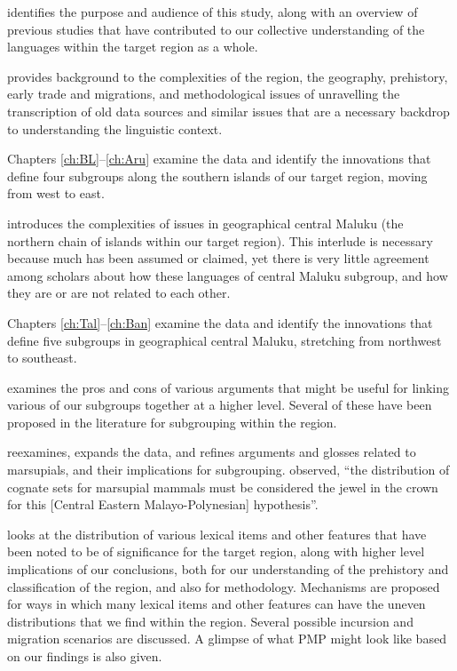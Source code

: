  identifies the purpose
and audience of this study,
along with an overview of previous studies that have contributed to our collective understanding of the languages within the target region as a whole.

 provides background to the complexities of the region,
the geography, prehistory, early trade
and migrations, and methodological issues of unravelling the transcription of old data sources
and similar issues that are a necessary backdrop to understanding the linguistic context.

Chapters \ref{ch:BL}--\ref{ch:Aru} examine the data
and identify the innovations that define four subgroups along the southern islands of our target region,
moving from west to east.

 introduces the complexities of issues in geographical central Maluku (the northern chain of islands within our target region).
This interlude is necessary because much has been assumed or claimed,
yet there is very little agreement among scholars about how these languages of central Maluku subgroup,
and how they are or are not related to each other.

Chapters \ref{ch:Tal}--\ref{ch:Ban} examine the data
and identify the innovations that define five subgroups in geographical central Maluku,
stretching from northwest to southeast.

 examines the pros
and cons of various arguments that might be useful for linking various of our subgroups together at a higher level.
Several of these have been proposed in the literature for subgrouping within the region.

 reexamines,
expands the data,
and refines arguments
and glosses related to marsupials,
and their implications for subgrouping.
\citet[727]{Blust2013} observed,
“the distribution of cognate sets for marsupial mammals must be considered the
jewel in the crown for this [Central Eastern Malayo-Polynesian] hypothesis”.

 looks at the distribution of various lexical items
and other features that have been noted to be of significance for the target region,
along with higher level implications of our conclusions,
both for our understanding of the prehistory
and classification of the region,
and also for methodology.
Mechanisms are proposed for ways in which many lexical items
and other features can have the uneven distributions that we find within the region.
Several possible incursion
and migration scenarios are discussed.
A glimpse of what PMP might look like based on our findings is also given.

